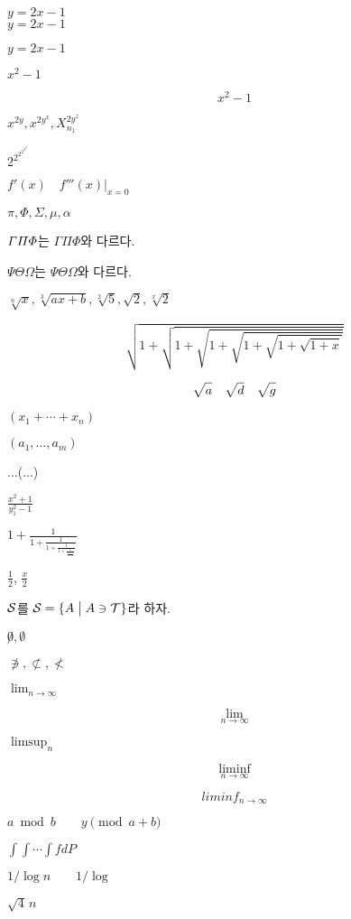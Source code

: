 \documentclass[11pt]{article}
\begin{document}
$y=2x-1$ \\

\(y=2x-1\)

\begin{math}
y=2x-1
\end{math}

$x^2-1$

$$x^2-1$$

$x^{2y}, x^{{2y}^x}, X_{n_1}^{2y^z}$

$2^{2^{2^{2^{2^{2^{2^{2}}}}}}}$

$f'(x) \quad f'''(x)|_{x=0}$
 
$\pi, \Phi, \Sigma, \mu, \alpha$

${\mit \Gamma \Pi \Phi}$는 $\Gamma \Pi \Phi$와 다르다.

$\mathit{\Psi \Theta \Omega}$는 $\Psi \Theta \Omega$와 다르다. 

$\sqrt[n]{x}, \sqrt[3]{ax+b}, \sqrt[2]{5}, \sqrt{2}, \sqrt[x]{2}$

\begin{equation} \label{eq:sqrt}
\sqrt{1+\sqrt{1+\sqrt{1+\sqrt{1+\sqrt{1+\sqrt{1+x}}}}}}
\end{equation}

$$\sqrt{\mathstrut a} \quad \sqrt{\mathstrut d} \quad \sqrt{\mathstrut g}$$

$(x_1+\cdots+x_n)$

$(a_1, \ldots, a_m)$

$\ldots$(...)

$\displaystyle \frac{x^2+1}{y_1^2-1}$

$1+\frac{1}{1+\frac{1}{1+\frac{1}{1+\frac{1}{\frac{1}{1+x}}}}}$

$\frac12$, $\frac x2$

${\cal S}$를 ${\cal S}=\{A \bigm|A \ni{\cal T}\}$라 하자.

$\not0, \emptyset$

$\not\ni, \not\subset, \not<$

$\lim_{n\to\infty}$

$$\lim_{n\to\infty}$$

$\limsup_{n}$

$$\liminf_{n\longrightarrow\infty}$$

$$liminf_{n\longrightarrow\infty}$$

$a \bmod b \qquad y \pmod{a+b}$

$\int\!\!\int \cdots \int f dP$

$1/\!\log n \qquad 1/\log$

$\sqrt{4} \, n$
\end{document}
